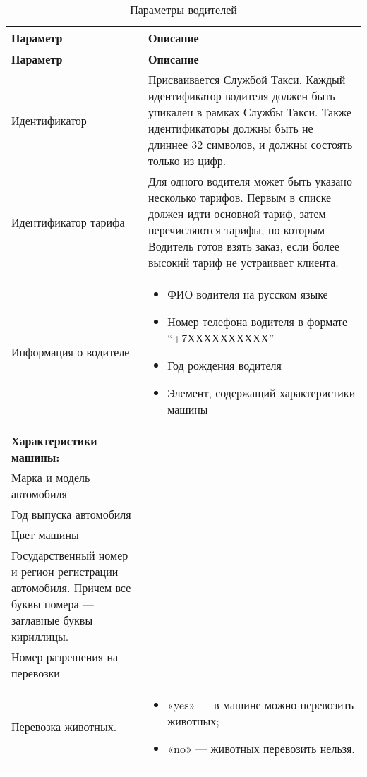 			\setlength{\extrarowheight}{2mm}
				\begin{longtable}{|p{4cm}|p{9cm}|}
					\caption {Параметры водителей}\\

				    \hline	\textbf{Параметр}&\textbf{Описание} \\ [2mm]
				    \endfirsthead
				    \hline	\textbf{Параметр}&\textbf{Описание} \\ [2mm]
				    \endhead

					\hline	Идентификатор &  Присваивается Службой Такси. Каждый идентификатор водителя должен быть уникален в рамках Службы Такси. Также идентификаторы должны быть не длиннее 32 символов, и должны состоять только из цифр. \\ [2mm]
				    \hline	Идентификатор тарифа & Для одного водителя может быть указано несколько тарифов. Первым в списке должен идти основной тариф, затем перечисляются тарифы, по которым Водитель готов взять заказ, если более высокий тариф не устраивает клиента. \\ [2mm]
					\hline	Информация о водителе & \begin{itemize} 
														\item ФИО водителя на русском языке
														\item Номер телефона водителя в формате “+7ХХХХХХХХХХ”
														\item Год рождения водителя
														\item Элемент, содержащий характеристики машины
													\end{itemize} \\ [2mm]
					\hline	\textbf{Характеристики машины:}	&\\ [2mm]					
					\hline	Марка и модель автомобиля &  \\ [2mm]
					\hline	Год выпуска автомобиля &  \\ [2mm]
					\hline	Цвет машины &  \\ [2mm]
					\hline	Государственный номер и регион регистрации автомобиля. Причем все буквы номера — заглавные буквы кириллицы. &  \\ [2mm]
					\hline	Номер разрешения на перевозки &  \\ [2mm]
					\hline	Перевозка животных. & 	\begin{itemize} 
														\item «yes» — в машине можно перевозить животных;
														\item «no» — животных перевозить нельзя.
													\end{itemize} \\ [2mm]

\end{longtable}
